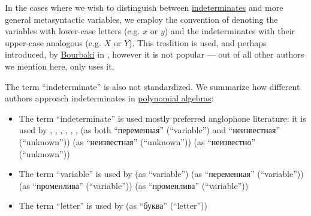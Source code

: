\begin{remark}\label{rem:conventions_for_indeterminates}
  In the cases where we wish to distinguish between \hyperref[con:indeterminate]{indeterminates} and more general metasyntactic variables, we employ the convention of denoting the variables with lower-case letters (e.g. \( x \) or \( y \)) and the indeterminates with their upper-case analogous (e.g. \( X \) or \( Y \)). This tradition is used, and perhaps introduced, by \hyperref[rem:bourbaki]{Bourbaki} in \cite[A III.25]{Bourbaki1970Algèbre1à3}, however it is not popular --- out of all other authors we mention here, only  uses it.

  The term \enquote{indeterminate} is also not standardized. We summarize how different authors approach indeterminates in \hyperref[def:polynomial_algebra]{polynomial algebras}:
  \begin{itemize}
    \item The term \enquote{indeterminate} is used mostly preferred anglophone literature:  it is used by
    ,
    ,
    ,
    ,
    ,
    ,
     (as both \enquote{переменная} (\enquote{variable}) and \enquote{неизвестная} (\enquote{unknown}))
     (as \enquote{неизвестная} (\enquote{unknown}))
     (as \enquote{неизвестно} (\enquote{unknown}))

    \item The term \enquote{variable} is used by
     (as \enquote{variable})
     (as \enquote{переменная} (\enquote{variable}))
     (as \enquote{променлива} (\enquote{variable}))
     (as \enquote{променлива} (\enquote{variable}))

    \item The term \enquote{letter} is used by
     (as \enquote{буква} (\enquote{letter}))
  \end{itemize}
\end{remark}

